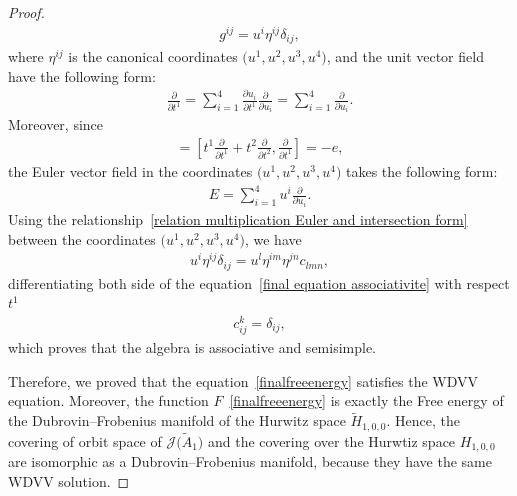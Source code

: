 \documentclass[10pt,a4paper]{amsart}
\numberwithin{equation}{section}
\newcommand{\Ja}{\mathcal{J}}
\begin{document}
\begin{proof}
\begin{gather*}
g^{ij}=u^i\eta^{ij}\delta_{ij},
\end{gather*}
where $\eta^{ij}$ is the canonical coordinates $\big(u^1,u^2,u^3,u^4\big)$,
 and the unit vector field have the following form:
\begin{gather*}
\frac{\partial}{\partial t^1}=\sum_{i=1}^4 \frac{\partial u_i}{\partial t^1}\frac{\partial}{\partial u_i}=\sum_{i=1}^4 \frac{\partial}{\partial u_i}.
\end{gather*}
Moreover, since
\begin{gather*}
[E,e]=\left[t^1\frac{\partial}{\partial t^1} +t^2\frac{\partial}{\partial t^2},\frac{\partial}{\partial t^1}\right]=-e,
\end{gather*}
the Euler vector field in the coordinates $\big(u^1,u^2,u^3,u^4\big)$ takes the following form:
\begin{gather*}
E=\sum_{i=1}^4 u^i\frac{\partial}{\partial u_i}.
\end{gather*}
 Using the relationship~\eqref{relation multiplication Euler and intersection form} between the coordinates $\big(u^1,u^2,u^3,u^4\big)$, we have
 \begin{gather}\label{final equation associativite}
u^i\eta^{ij}\delta_{ij}=u^l\eta^{im}\eta^{jn}c_{lmn},
\end{gather}
differentiating both side of the equation~\eqref{final equation associativite} with respect $t^1$
 \begin{gather*}
 c_{ij}^k=\delta_{ij},
\end{gather*}
which proves that the algebra is associative and semisimple.

Therefore, we proved that the equation~\eqref{finalfreeenergy} satisfies the WDVV equation. Moreover, the function $F$~\eqref{finalfreeenergy} is exactly the Free energy of the Dubrovin--Frobenius manifold of the Hurwitz space $\widetilde H_{1,0,0}$. Hence, the covering of orbit space of $\Ja\big(\tilde A_1\big)$ and the covering over the Hurwtiz space $H_{1,0,0}$ are isomorphic as a Dubrovin--Frobenius manifold, because they have the same WDVV solution.
\end{proof}
\end{document}
